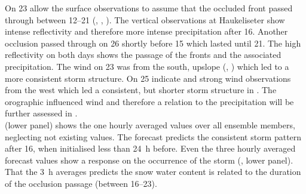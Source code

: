 On \SI{23}{\dec} allow the surface observations to assume that the occluded front passed through between \SIrange{12}{21}{\UTC} (, , ). The vertical observations at Haukeliseter show intense reflectivity and therefore more intense precipitation after \SI{16}{\UTC}. Another occlusion passed through on \SI{26}{\dec} shortly before \SI{15}{\UTC} which lasted until \SI{21}{\UTC}. The high reflectivity on both days shows the passage of the fronts and the associated precipitation. The wind on \SI{23}{\dec} was from the south, upslope (, ) which led to a more consistent storm structure. On \SI{25}{\dec} indicate  and  strong wind observations from the west which led a consistent, but shorter storm structure in . The orographic influenced wind and therefore a relation to the precipitation will be further assessed in . 
\\
 (lower panel) shows the one hourly averaged values over all ensemble members, neglecting not existing values. The forecast predicts the consistent storm pattern after \SI{16}{\UTC}, when initialised less than \SI{24}{\hour} before. Even the three hourly averaged forecast values show a response on the occurrence of the storm (, lower panel). That the \SI{3}{\hour} averages predicts the snow water content is related to the duration of the occlusion passage (between \SIrange{16}{23}{\UTC}).
